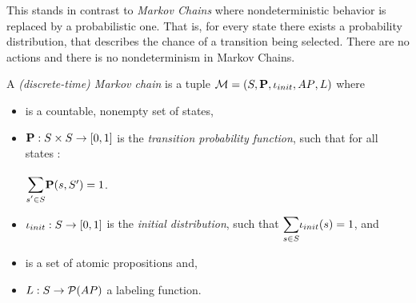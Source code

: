 \documentclass[preview]{standalone}
\begin{document}
This stands in contrast to \emph{Markov Chains} where nondeterministic behavior is replaced by a probabilistic one. That is, for every state there exists a probability distribution, that describes the chance of a transition being selected. There are no actions and there is no nondeterminism in Markov Chains.
%
\begin{definition}
	A \emph{(discrete-time) Markov chain} is a tuple ${\mathcal{M}} = ({S}, {\textbf{P}}, {\iota_{init}}, {AP}, {L})$ where 
	\begin{itemize}
		\item \states is a countable, nonempty set of states,
		\item ${\textbf{P}} : {S} \times {S} \to [0,1]$ is the \emph{transition probability function}, such that for all states \state:
		\begin{center}
			$\bbigsum{\state' \in \states}\probtfunc(\state,\states') = 1$.	
		\end{center}
		\item ${\iota_{init}} : {S} \to [0,1]$ is the \emph{initial distribution}, such that $\mathlarger{\sum_{\state \in \states}} \initdistrib(\state) = 1$, and
		\item \atomicprops is a set of atomic propositions and,
		\item ${L} : {S} \to {\mathcal{P}(\ensuremath{{AP}})}$ a labeling function.		
	\end{itemize}
\end{definition}
\end{document}

